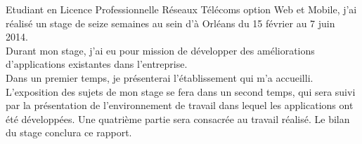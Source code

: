 

Etudiant en Licence Professionnelle Réseaux Télécoms option Web et Mobile, 
j’ai réalisé un stage de seize semaines au sein d'\interlog à Orléans du 15 février au 7 juin 2014.\\

Durant mon stage, j’ai eu pour mission de développer des améliorations d'applications existantes
dans l'entreprise.\\


Dans un premier temps, je présenterai l’établissement qui m’a accueilli. L’exposition
des sujets de mon stage se fera dans un second temps, qui sera suivi par la présentation de
l’environnement de travail dans lequel les applications ont été développées. Une quatrième
partie sera consacrée au travail réalisé. Le bilan du stage conclura ce rapport.



